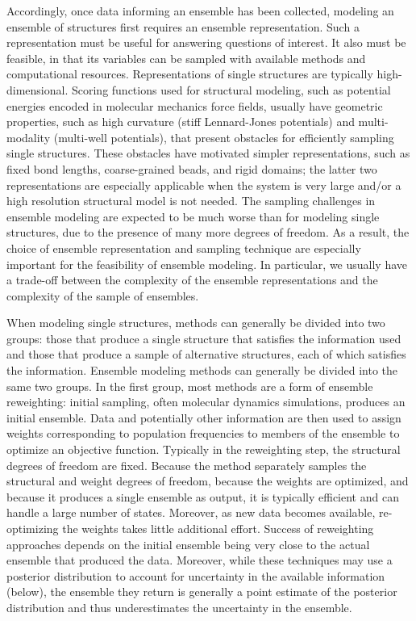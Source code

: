 \documentclass[../../main.tex]{subfiles}
\begin{document}
\begin{refsection}
	Accordingly, once data informing an ensemble has been collected, modeling an ensemble of structures first requires an ensemble representation.
	Such a representation must be useful for answering questions of interest.
	It also must be feasible, in that its variables can be sampled with available methods and computational resources.
	Representations of single structures are typically high-dimensional.
	Scoring functions used for structural modeling, such as potential energies encoded in molecular mechanics force fields, usually have geometric properties, such as high curvature (\eg stiff Lennard-Jones potentials) and multi-modality (\eg multi-well potentials), that present obstacles for efficiently sampling single structures.
	These obstacles have motivated simpler representations, such as fixed bond lengths, coarse-grained beads, and rigid domains; the latter two representations are especially applicable when the system is very large and/or a high resolution structural model is not needed.
	The sampling challenges in ensemble modeling are expected to be much worse than for modeling single structures, due to the presence of many more degrees of freedom.
	As a result, the choice of ensemble representation and sampling technique are especially important for the feasibility of ensemble modeling.
	In particular, we usually have a trade-off between the complexity of the ensemble representations and the complexity of the sample of ensembles.


	When modeling single structures, methods can generally be divided into two groups: those that produce a single structure that satisfies the information used and those that produce a sample of alternative structures, each of which satisfies the information.
	Ensemble modeling methods can generally be divided into the same two groups.
	In the first group, most methods are a form of ensemble reweighting: initial sampling, often molecular dynamics simulations, produces an initial ensemble.
	Data and potentially other information are then used to assign weights corresponding to population frequencies to members of the ensemble to optimize an objective function.
	Typically in the reweighting step, the structural degrees of freedom are fixed.
	Because the method separately samples the structural and weight degrees of freedom, because the weights are optimized, and because it produces a single ensemble as output, it is typically efficient and can handle a large number of states.
	Moreover, as new data becomes available, re-optimizing the weights takes little additional effort.
	Success of reweighting approaches depends on the initial ensemble being very close to the actual ensemble that produced the data.
	Moreover, while these techniques may use a posterior distribution to account for uncertainty in the available information (below), the ensemble they return is generally a point estimate of the posterior distribution and thus underestimates the uncertainty in the ensemble.


\end{refsection}
\end{document}
